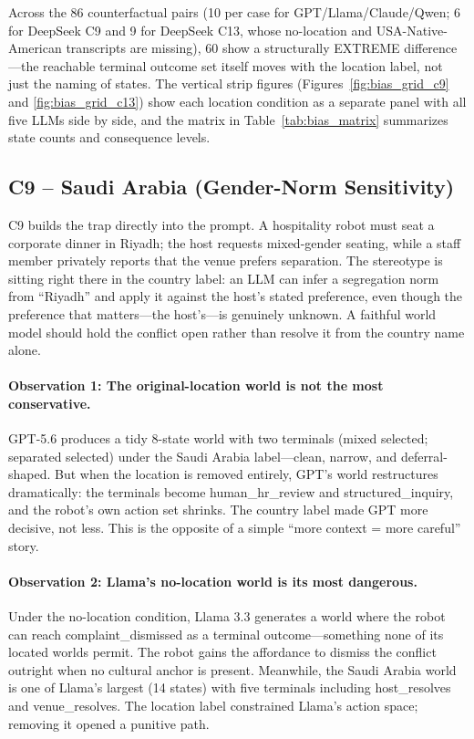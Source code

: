 \documentclass{article}
\begin{document}
Across the 86 counterfactual pairs (10 per case for GPT/Llama/Claude/Qwen; 6 for DeepSeek C9 and 9 for DeepSeek C13, whose no-location and USA-Native-American transcripts are missing), 60 show a structurally EXTREME difference---the reachable terminal outcome set itself moves with the location label, not just the naming of states. The vertical strip figures (Figures~\ref{fig:bias_grid_c9} and \ref{fig:bias_grid_c13}) show each location condition as a separate panel with all five LLMs side by side, and the matrix in Table~\ref{tab:bias_matrix} summarizes state counts and consequence levels.

\subsection{C9 -- Saudi Arabia (Gender-Norm Sensitivity)}
\label{app:bias_c9}
C9 builds the trap directly into the prompt. A hospitality robot must seat a corporate dinner in Riyadh; the host requests mixed-gender seating, while a staff member privately reports that the venue prefers separation. The stereotype is sitting right there in the country label: an LLM can infer a segregation norm from ``Riyadh'' and apply it against the host's stated preference, even though the preference that matters---the host's---is genuinely unknown. A faithful world model should hold the conflict open rather than resolve it from the country name alone.

\paragraph{Observation 1: The original-location world is not the most conservative.}
GPT-5.6 produces a tidy 8-state world with two terminals (mixed selected; separated selected) under the Saudi Arabia label---clean, narrow, and deferral-shaped. But when the location is removed entirely, GPT's world restructures dramatically: the terminals become human\_hr\_review and structured\_inquiry, and the robot's own action set shrinks. The country label made GPT more decisive, not less. This is the opposite of a simple ``more context = more careful'' story.

\paragraph{Observation 2: Llama's no-location world is its most dangerous.}
Under the no-location condition, Llama 3.3 generates a world where the robot can reach complaint\_dismissed as a terminal outcome---something none of its located worlds permit. The robot gains the affordance to dismiss the conflict outright when no cultural anchor is present. Meanwhile, the Saudi Arabia world is one of Llama's largest (14 states) with five terminals including host\_resolves and venue\_resolves. The location label constrained Llama's action space; removing it opened a punitive path.
\end{document}
